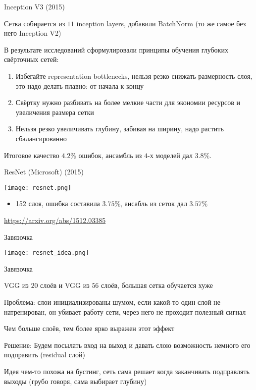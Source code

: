 \documentclass[notes,12pt, aspectratio=169]{beamer}
\newenvironment{wideitemize}{\itemize\addtolength{\itemsep}{10pt}}{\enditemize}
\begin{document}
\begin{frame}{Inception V3 (2015)}
\begin{wideitemize}
	\item  Сетка собирается из $11$ inception layers, добавили BatchNorm (то же самое без него Inception V2)
	
	\item В результате исследований сформулировали принципы обучения глубоких свёрточных сетей: 
	
	\begin{enumerate}
		\item  Избегайте representation bottlenecks, нельзя резко снижать размерность слоя, это надо делать плавно: от начала к концу
		\item Свёртку нужно разбивать на более мелкие части для экономии ресурсов и увеличения размера сетки 
		\item Нельзя резко увеличивать глубину, забивая на ширину, надо растить сбалансированно
	\end{enumerate} 

	\item Итоговое качество $4.2\%$ ошибок, ансамбль из $4$-х моделей дал $3.8\%$. 
\end{wideitemize}
\end{frame}


\begin{frame}{ResNet (Microsoft) (2015)}
\begin{center}
	\texttt{[image: resnet.png]}
\end{center}
\begin{itemize}
	\item 152 слоя, ошибка составила $3.75\%$, ансабль из сеток дал $3.57\%$
\end{itemize}
\vfill %
\footnotesize
\color{blue} \url{https://arxiv.org/abs/1512.03385}
\end{frame}


\begin{frame}{Завязочка}
\begin{center}
	\texttt{[image: resnet\_idea.png]}
\end{center}
\end{frame}


\begin{frame}{Завязочка}
\begin{wideitemize}
	\item  VGG из $20$ слоёв и VGG из $56$ слоёв,  большая сетка обучается хуже
	\item  \alert{Проблема:} слои инициализированы шумом, если какой-то один слой не натренирован, он убивает работу сети, через него не проходит полезный сигнал 
	\item Чем больше слоёв, тем более ярко выражен этот эффект 
	\item \alert{Решение:} Будем посылать вход на выход и давать слою возможность немного его подправить (residual слой)
	\item Идея чем-то похожа на бустинг, сеть сама решает когда заканчивать подправлять выходы (грубо говоря, сама выбирает глубину)
\end{wideitemize}
\end{frame}
\end{document}
